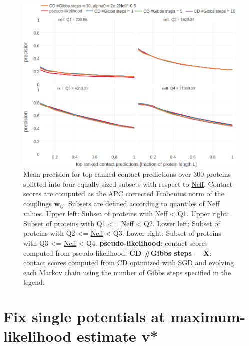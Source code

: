 \documentclass[11pt,a4paper,twoside]{book}
\newcommand{\wij}{\mathbf{w}_{ij}}
\theoremstyle{definition}
\theoremstyle{definition}
\theoremstyle{remark}
\begin{document}
\begin{figure}

{\centering \includegraphics[width=1\linewidth]{img/full_likelihood/appendix/precision_vs_rank_facetted_by_neff_gibbssteps} 

}

\caption{Mean precision for top ranked
contact predictions over 300 proteins splitted into four equally sized
subsets with respect to \protect\hyperlink{abbrev}{Neff}. Contact scores
are computed as the \protect\hyperlink{abbrev}{APC} corrected Frobenius
norm of the couplings \(\wij\). Subsets are defined according to
quantiles of \protect\hyperlink{abbrev}{Neff} values. Upper left: Subset
of proteins with \protect\hyperlink{abbrev}{Neff} \textless{} Q1. Upper
right: Subset of proteins with Q1 \textless{}=
\protect\hyperlink{abbrev}{Neff} \textless{} Q2. Lower left: Subset of
proteins with Q2 \textless{}= \protect\hyperlink{abbrev}{Neff}
\textless{} Q3. Lower right: Subset of proteins with Q3 \textless{}=
\protect\hyperlink{abbrev}{Neff} \textless{} Q4.
\textbf{pseudo-likelihood}: contact scores computed from
pseudo-likelihood. \textbf{CD \#Gibbs steps = X}: contact scores
computed from \protect\hyperlink{abbrev}{CD} optimized with
\protect\hyperlink{abbrev}{SGD} and evolving each Markov chain using the
number of Gibbs steps specified in the legend.}\label{fig:cd-precision-gibbssteps-neff}
\end{figure}

\section{Fix single potentials at maximum-likelihood estimate
v*}\label{fix-single-potentials-at-maximum-likelihood-estimate-v}
\end{document}
